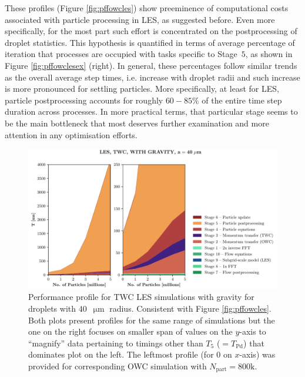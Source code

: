 \documentclass{pracamgren}
\begin{document}
These profiles (Figure \ref{fig:pffowcles}) show preeminence of computational costs associated with particle processing in LES, as suggested before.
Even more specifically, for the most part such effort is concentrated on the postprocessing of droplet statistics.
This hypothesis is quantified in terms of average percentage of iteration that processes are occupied with tasks specific to Stage~$5$, as shown in Figure \ref{fig:pffowclesex} (right).
In general, these percentages follow similar trends as the overall average step times, i.e. increase with droplet radii and such increase is more pronounced for settling particles.
More specifically, at least for LES, particle postprocessing accounts for roughly $60-85 \%$ of the entire time step duration across processes.
In more practical terms, that particular stage seems to be the main bottleneck that most deserves further examination and more attention in any optimisation efforts.  

\begin{figure}[h]
\centering
\includegraphics[width=13.5cm]{figures/3-08_pfftwcles.pdf}
\caption{
Performance profile for TWC LES simulations with gravity for droplets with $40$~$\upmu\text{m}$ radius.
Consistent with Figure \ref{fig:pffowcles}.
Both plots present profiles for the same range of simulations but the one on the right focuses on smaller span of values on the $y$-axis to ``magnify'' data pertaining to timings other than $T_5$ ($ = T_{\text{Pd}}$) that dominates plot on the left.
The leftmost profile (for $0$ on $x$-axis) was provided for corresponding OWC simulation with $N_{\text{part}} = 800\text{k}$. 
}
\label{fig:pfftwcles}
\end{figure}
\end{document}
